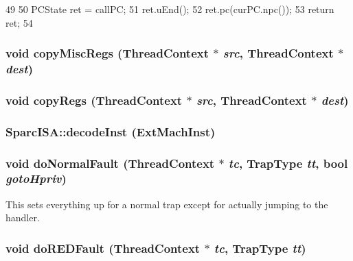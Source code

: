 \begin{DoxyCode}
49 {
50     PCState ret = callPC;
51     ret.uEnd();
52     ret.pc(curPC.npc());
53     return ret;
54 }
\end{DoxyCode}
\hypertarget{namespaceSparcISA_a42833096094e5ff0f2de948bf8e5965c}{
\subsubsection[{copyMiscRegs}]{\setlength{\rightskip}{0pt plus 5cm}void copyMiscRegs ({\bf ThreadContext} $\ast$ {\em src}, \/  {\bf ThreadContext} $\ast$ {\em dest})}}
\label{namespaceSparcISA_a42833096094e5ff0f2de948bf8e5965c}
\hypertarget{namespaceSparcISA_aaeffcccf262b0dbd3cbcc8b4cef41168}{
\subsubsection[{copyRegs}]{\setlength{\rightskip}{0pt plus 5cm}void copyRegs ({\bf ThreadContext} $\ast$ {\em src}, \/  {\bf ThreadContext} $\ast$ {\em dest})}}
\label{namespaceSparcISA_aaeffcccf262b0dbd3cbcc8b4cef41168}
\hypertarget{namespaceSparcISA_aaf291bfb6ea39d0d8b0c369307f2eb92}{
\subsubsection[{decodeInst}]{ SparcISA::decodeInst (ExtMachInst)}}
\label{namespaceSparcISA_aaf291bfb6ea39d0d8b0c369307f2eb92}
\hypertarget{namespaceSparcISA_ac81fd7b66ea3afdf9597646f8732c2ff}{
\subsubsection[{doNormalFault}]{\setlength{\rightskip}{0pt plus 5cm}void doNormalFault ({\bf ThreadContext} $\ast$ {\em tc}, \/  TrapType {\em tt}, \/  bool {\em gotoHpriv})}}
\label{namespaceSparcISA_ac81fd7b66ea3afdf9597646f8732c2ff}
This sets everything up for a normal trap except for actually jumping to the handler. \hypertarget{namespaceSparcISA_a0a06026b205d00709c2f34b018fc1dfd}{
\subsubsection[{doREDFault}]{\setlength{\rightskip}{0pt plus 5cm}void doREDFault ({\bf ThreadContext} $\ast$ {\em tc}, \/  TrapType {\em tt})}}
